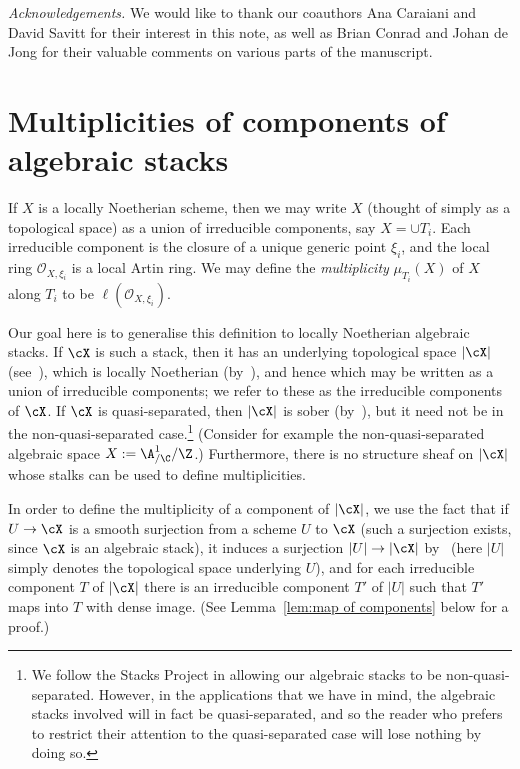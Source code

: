 \smallskip

{\em Acknowledgements.}  We would like to thank our coauthors 
Ana Caraiani and David Savitt for their interest in this note,
as well as Brian Conrad and Johan de Jong for their valuable comments
on various parts of the manuscript.

\section{Multiplicities of components of algebraic stacks}
\label{sec:multiplicities}

If $X$ is a locally Noetherian scheme, then we may write $X$ (thought
of simply as a topological space) as a union 
of irreducible components, say $X = \cup T_i.$  Each irreducible
component is the closure of a unique generic point $\xi_i$, 
and the local ring $\mathcal O_{X,\xi_i}$ is a local Artin ring.
We may define the {\em multiplicity} $\mu_{T_i}(X)$ of $X$ along $T_i$ 
to be $\ell(\mathcal O_{X,\xi_i}).$  


Our goal here is to generalise this definition to locally
Noetherian algebraic stacks.   If $\cX$ is such a stack, 
then it has an underlying topological space $|\cX|$
(see~\cite[\href{http://stacks.math.columbia.edu/tag/04Y8}{Definition 04Y8}]{stacks-project}),
which is locally
Noetherian
(by~\cite[\href{http://stacks.math.columbia.edu/tag/04Z8}{Definition 04Z8}]{stacks-project}),
and hence which may be written as a union of irreducible
components; we refer to these as the irreducible components of $\cX$.
If $\cX$ is quasi-separated, then $|\cX|$ is sober (by~\cite[Cor.\
5.7.2]{MR1771927}), but it need not be in the non-quasi-separated case.\footnote{We follow
      the Stacks Project in allowing our algebraic stacks
      to be non-quasi-separated.  However,
in the applications that we have in mind, the algebraic stacks involved
will in fact
be quasi-separated, and so the reader who prefers to restrict their
attention to the quasi-separated case will lose nothing by doing so.}
(Consider
for example the non-quasi-separated algebraic space $X := \A^1_{/\C}/\Z$.)
Furthermore, there is no structure sheaf
on $|\cX|$ whose stalks can be used to define multiplicities.

In order to define the multiplicity of a component of $|\cX|$,
we use the fact that if $U \to \cX$ is a smooth surjection
from a scheme $U$ to $\cX$ (such a surjection exists,
since $\cX$ is an algebraic stack), it induces a surjection
$|U| \to |\cX|$ by~\cite[\href{http://stacks.math.columbia.edu/tag/04XI}{Tag 04XI}]{stacks-project} (here $|U|$ simply denotes the topological
space underlying $U$), and for each irreducible component
$T$ of $|\cX|$ there is an irreducible component $T'$ of
$|U|$ such that $T'$ maps into $T$ with dense image.
(See Lemma~\ref{lem:map of components} below for a proof.)

